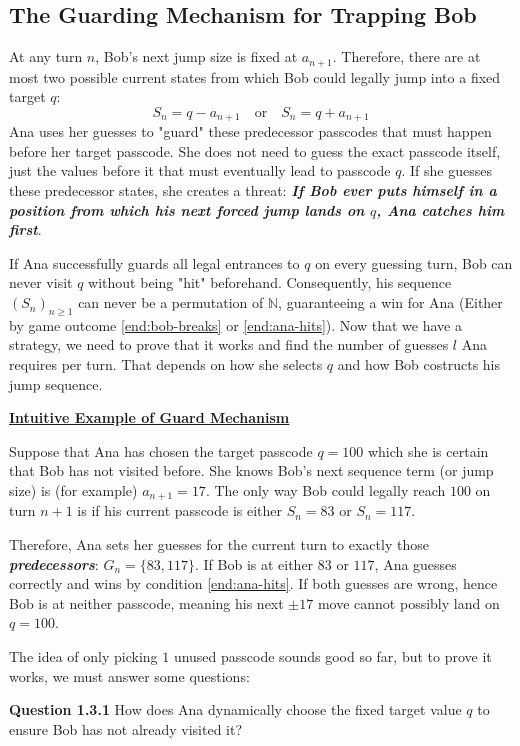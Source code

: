 \subsection{The Guarding Mechanism for Trapping Bob}

At any turn $n$, Bob's next jump size is fixed at $a_{n+1}$. Therefore, there are at most two possible current states from which Bob could legally jump into a fixed target $q$:
  $$S_n = q - a_{n+1} \quad \text{or} \quad S_n = q + a_{n+1}$$  
Ana uses her guesses to "guard" these predecessor passcodes that must happen before her target passcode. She does not need to guess the exact passcode itself, just the values before it that must eventually lead to passcode $q$. If she guesses these predecessor states, she creates a threat: \textbf{\textit{If Bob ever puts himself in a position from which his next forced jump lands on $q$, Ana catches him first}}.


If Ana successfully guards all legal entrances to $q$ on every guessing turn, Bob can never visit $q$ without being "hit" beforehand. Consequently, his sequence $(S_n)_{n \ge 1}$ can never be a permutation of $\mathbb{N}$, guaranteeing a win for Ana (Either by game outcome \ref{end:bob-breaks} or \ref{end:ana-hits}). Now that we have a strategy, we need to prove that it works and find the number of guesses $l$ Ana requires per turn. That depends on how she selects $q$ and how Bob costructs his jump sequence.

\noindent
\ul{\textbf{Intuitive Example of Guard Mechanism}}

\noindent
Suppose that Ana has chosen the target passcode $q = 100$ which she is certain that Bob has not visited before. She knows Bob's next sequence term (or jump size) is (for example) $a_{n+1} = 17$. The only way Bob could legally reach $100$ on turn $n+1$ is if his current passcode is either $S_n = 83$ or $S_n = 117$.


Therefore, Ana sets her guesses for the current turn to exactly those \textit{\textbf{predecessors}}: $G_n = \{83, 117\}$. If Bob is at either $83$ or $117$, Ana guesses correctly and wins by condition \ref{end:ana-hits}. If both guesses are wrong, hence Bob is at neither passcode, meaning his next $\pm 17$ move cannot possibly land on $q = 100$. 

\noindent
The idea of only picking $1$ unused passcode sounds good so far, but to prove it works, we must answer some questions:
\begin{questionbox}
\textbf{Question 1.3.1}
How does Ana dynamically choose the fixed target value $q$ to ensure Bob has not already visited it?
\end{questionbox}

